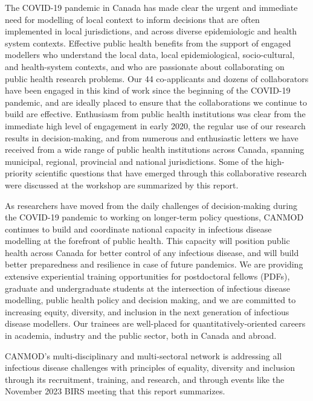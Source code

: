 The COVID-19 pandemic in Canada has made clear the urgent and
immediate need for modelling of local context to inform decisions that
are often implemented in local jurisdictions, and across diverse
epidemiologic and health system contexts. Effective public health
benefits from the support of engaged modellers who understand the
local data, local epidemiological, socio-cultural, and health-system
contexts, and who are passionate about collaborating on public health
research problems. Our 44 co-applicants and dozens of collaborators
have been engaged in this kind of work since the beginning of the
COVID-19 pandemic, and are ideally placed to ensure that the
collaborations we continue to build are effective. Enthusiasm from
public health institutions was clear from the immediate high level of
engagement in early 2020, the regular use of our research results in
decision-making, and from numerous and enthusiastic letters we have
received from a wide range of public health institutions across
Canada, spanning municipal, regional, provincial and national
jurisdictions. Some of the high-priority scientific questions that
have emerged through this collaborative research were discussed at the
workshop are summarized by this report.


As researchers have moved from the daily challenges of
decision-making during the COVID-19 pandemic to working on longer-term
policy questions, CANMOD continues to build and coordinate national
capacity in infectious disease modelling at the forefront of public
health. This capacity will position public health across Canada for
better control of any infectious disease, and will build better
preparedness and resilience in case of future pandemics. We are providing extensive experiential training opportunities for
postdoctoral fellows (PDFs), graduate and undergraduate students at
the intersection of infectious disease modelling, public health policy
and decision making, and we are committed to increasing equity,
diversity, and inclusion in the next generation of infectious disease
modellers. Our trainees are well-placed for quantitatively-oriented
careers in academia, industry and the public sector, both in Canada
and abroad.


CANMOD’s multi-disciplinary and multi-sectoral network is addressing
all infectious disease challenges with principles of equality,
diversity and inclusion through its recruitment, training, and
research, and through events like the November 2023 BIRS meeting that
this report summarizes.
